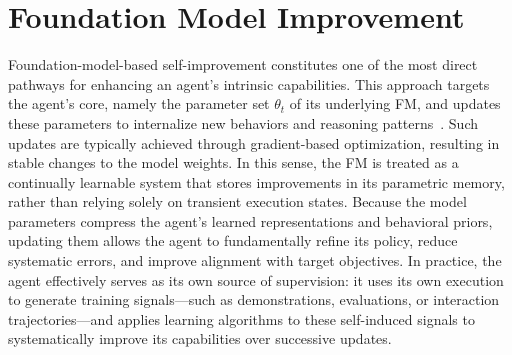 \section{Foundation Model Improvement}
\label{sec:Foundation_Model_Improvement}


Foundation-model-based self-improvement constitutes one of the most direct pathways for enhancing an agent’s intrinsic capabilities. This approach targets the agent’s core, namely the parameter set $\theta_{t}$ of its underlying FM, and updates these parameters to internalize new behaviors and reasoning patterns~\citep{wang2022self, bai2022constitutional, shafayat2025can, bensal2025reflect, dong2025tool, wang2025ragenunderstandingselfevolutionllm, zhou2025selfchallenging}. Such updates are typically achieved through gradient-based optimization, resulting in stable changes to the model weights. In this sense, the FM is treated as a continually learnable system that stores improvements in its parametric memory, rather than relying solely on transient execution states. Because the model parameters compress the agent's learned representations and behavioral priors, updating them allows the agent to fundamentally refine its policy, reduce systematic errors, and improve alignment with target objectives. In practice, the agent effectively serves as its own source of supervision: it uses its own execution to generate training signals—such as demonstrations, evaluations, or interaction trajectories—and applies learning algorithms to these self-induced signals to systematically improve its capabilities over successive updates.

